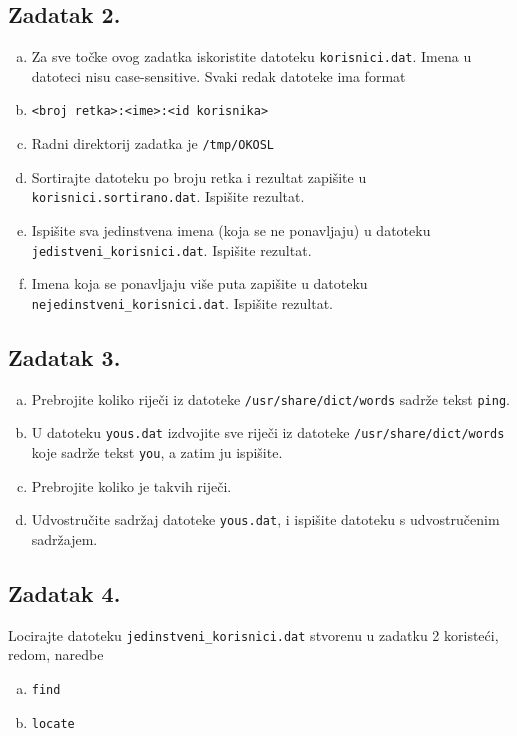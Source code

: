 \documentclass{exam}
\newcommand{\shell}[1]{\texttt{#1}}
\begin{document}
  \subsection*{Zadatak 2.}
  \begin{enumerate}[(a)]
    \item[] Za sve točke ovog zadatka iskoristite datoteku \texttt{korisnici.dat}. Imena u datoteci nisu case-sensitive. Svaki redak datoteke ima format
    \item[] \texttt{<broj retka>:<ime>:<id korisnika>}
    \item[] Radni direktorij zadatka je \shell{/tmp/OKOSL}
    \item Sortirajte datoteku po broju retka i rezultat zapišite u \texttt{korisnici.sortirano.dat}. Ispišite rezultat.
    \item Ispišite sva jedinstvena imena (koja se ne ponavljaju) u datoteku\\\texttt{jedistveni\_korisnici.dat}.  Ispišite rezultat.
    \item Imena koja se ponavljaju više puta zapišite u datoteku\\\texttt{nejedinstveni\_korisnici.dat}.  Ispišite rezultat.
  \end{enumerate}
  \subsection*{Zadatak 3.}
  \begin{enumerate}[(a)]
  	\item Prebrojite koliko riječi iz datoteke \texttt{/usr/share/dict/words} sadrže tekst \shell{ping}.
  	\item U datoteku \texttt{yous.dat} izdvojite sve riječi iz datoteke \texttt{/usr/share/dict/words} koje sadrže tekst \shell{you}, a zatim ju ispišite.
  	\item Prebrojite koliko je takvih riječi.
  	\item Udvostručite sadržaj datoteke \texttt{yous.dat}, i ispišite datoteku s udvostručenim sadržajem.
  \end{enumerate}
  \subsection*{Zadatak 4.}
  Locirajte datoteku \texttt{jedinstveni\_korisnici.dat} stvorenu u zadatku 2 koristeći, redom, naredbe
  \begin{enumerate}[(a)]
    \item \texttt{find}
    \item \texttt{locate}
\end{enumerate}
\end{document}
